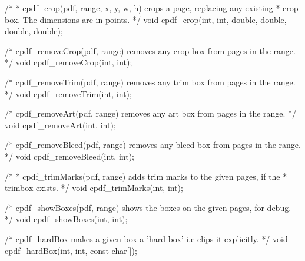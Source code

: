 /*
 * cpdf_crop(pdf, range, x, y, w, h) crops a page, replacing any existing
 * crop box. The dimensions are in points.
 */
void cpdf_crop(int, int, double, double, double, double);

/* cpdf_removeCrop(pdf, range) removes any crop box from pages in the range. */
void cpdf_removeCrop(int, int);

/* cpdf_removeTrim(pdf, range) removes any trim box from pages in the range. */
void cpdf_removeTrim(int, int);

/* cpdf_removeArt(pdf, range) removes any art box from pages in the range. */
void cpdf_removeArt(int, int);

/* cpdf_removeBleed(pdf, range) removes any bleed box from pages in the range. */
void cpdf_removeBleed(int, int);

/*
 * cpdf_trimMarks(pdf, range) adds trim marks to the given pages, if the
 * trimbox exists.
 */
void cpdf_trimMarks(int, int);

/* cpdf_showBoxes(pdf, range) shows the boxes on the given pages, for debug. */
void cpdf_showBoxes(int, int);

/* cpdf_hardBox makes a given box a 'hard box' i.e clips it explicitly. */
void cpdf_hardBox(int, int, const char[]);

